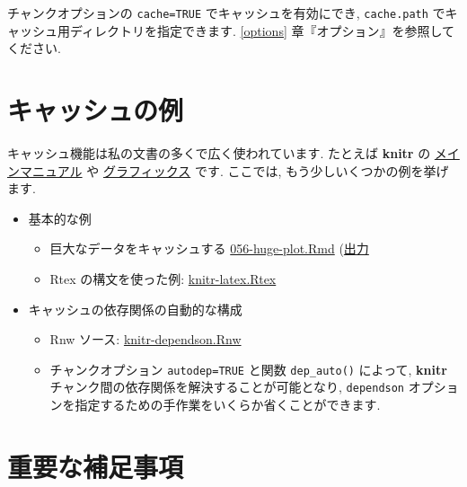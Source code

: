 \documentclass[
  lualatex,ja=standard,jafont=noto-otf]{bxjsreport}
\providecommand{\tightlist}{%
  \setlength{\itemsep}{0pt}\setlength{\parskip}{0pt}}
\begin{document}
チャンクオプションの \texttt{cache=TRUE} でキャッシュを有効にでき,
\texttt{cache.path} でキャッシュ用ディレクトリを指定できます.
\ref{options} 章『オプション』を参照してください.

\hypertarget{ux30adux30e3ux30c3ux30b7ux30e5ux306eux4f8b}{%
\section*{キャッシュの例}\label{ux30adux30e3ux30c3ux30b7ux30e5ux306eux4f8b}}

キャッシュ機能は私の文書の多くで広く使われています. たとえば
\textbf{knitr} の \protect\hyperlink{manual}{メインマニュアル} や
\protect\hyperlink{graphics}{グラフィックス} です. ここでは,
もう少しいくつかの例を挙げます.

\begin{itemize}
\tightlist
\item
  基本的な例

  \begin{itemize}
  \tightlist
  \item
    巨大なデータをキャッシュする
    \href{https://github.com/yihui/knitr-examples/raw/master/056-huge-plot.Rmd}{056-huge-plot.Rmd}
    (\href{https://github.com/yihui/knitr-examples/blob/master/056-huge-plot.md}{出力}
  \item
    Rtex の構文を使った例:
    \href{https://github.com/yihui/knitr/blob/master/inst/examples/knitr-latex.Rtex}{knitr-latex.Rtex}
  \end{itemize}
\item
  キャッシュの依存関係の自動的な構成

  \begin{itemize}
  \tightlist
  \item
    Rnw ソース:
    \href{https://github.com/yihui/knitr-examples/blob/master/017-auto-dependson.Rnw}{knitr-dependson.Rnw}
  \item
    チャンクオプション \texttt{autodep=TRUE} と関数 \texttt{dep\_auto()}
    によって, \textbf{knitr}
    チャンク間の依存関係を解決することが可能となり, \texttt{dependson}
    オプションを指定するための手作業をいくらか省くことができます.
  \end{itemize}
\end{itemize}

\hypertarget{ux91cdux8981ux306aux88dcux8db3ux4e8bux9805}{%
\section*{重要な補足事項}\label{ux91cdux8981ux306aux88dcux8db3ux4e8bux9805}}
\end{document}
